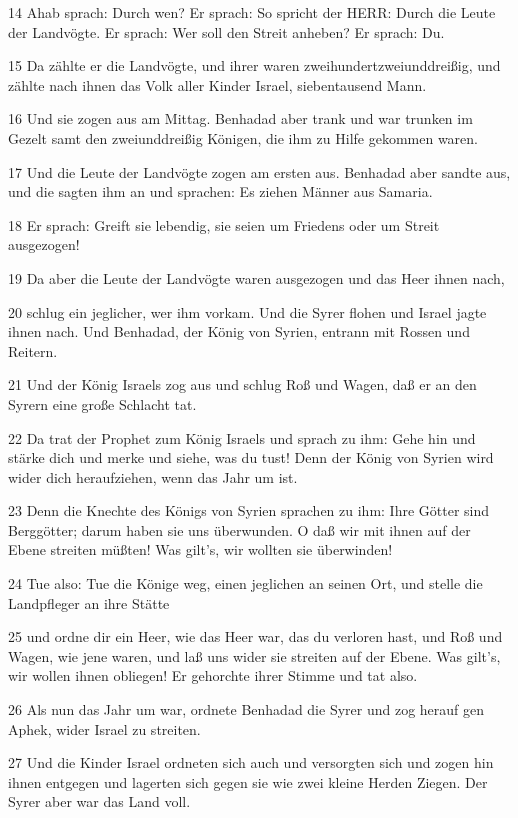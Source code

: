 \par 14 Ahab sprach: Durch wen? Er sprach: So spricht der HERR: Durch die Leute der Landvögte. Er sprach: Wer soll den Streit anheben? Er sprach: Du.
\par 15 Da zählte er die Landvögte, und ihrer waren zweihundertzweiunddreißig, und zählte nach ihnen das Volk aller Kinder Israel, siebentausend Mann.
\par 16 Und sie zogen aus am Mittag. Benhadad aber trank und war trunken im Gezelt samt den zweiunddreißig Königen, die ihm zu Hilfe gekommen waren.
\par 17 Und die Leute der Landvögte zogen am ersten aus. Benhadad aber sandte aus, und die sagten ihm an und sprachen: Es ziehen Männer aus Samaria.
\par 18 Er sprach: Greift sie lebendig, sie seien um Friedens oder um Streit ausgezogen!
\par 19 Da aber die Leute der Landvögte waren ausgezogen und das Heer ihnen nach,
\par 20 schlug ein jeglicher, wer ihm vorkam. Und die Syrer flohen und Israel jagte ihnen nach. Und Benhadad, der König von Syrien, entrann mit Rossen und Reitern.
\par 21 Und der König Israels zog aus und schlug Roß und Wagen, daß er an den Syrern eine große Schlacht tat.
\par 22 Da trat der Prophet zum König Israels und sprach zu ihm: Gehe hin und stärke dich und merke und siehe, was du tust! Denn der König von Syrien wird wider dich heraufziehen, wenn das Jahr um ist.
\par 23 Denn die Knechte des Königs von Syrien sprachen zu ihm: Ihre Götter sind Berggötter; darum haben sie uns überwunden. O daß wir mit ihnen auf der Ebene streiten müßten! Was gilt's, wir wollten sie überwinden!
\par 24 Tue also: Tue die Könige weg, einen jeglichen an seinen Ort, und stelle die Landpfleger an ihre Stätte
\par 25 und ordne dir ein Heer, wie das Heer war, das du verloren hast, und Roß und Wagen, wie jene waren, und laß uns wider sie streiten auf der Ebene. Was gilt's, wir wollen ihnen obliegen! Er gehorchte ihrer Stimme und tat also.
\par 26 Als nun das Jahr um war, ordnete Benhadad die Syrer und zog herauf gen Aphek, wider Israel zu streiten.
\par 27 Und die Kinder Israel ordneten sich auch und versorgten sich und zogen hin ihnen entgegen und lagerten sich gegen sie wie zwei kleine Herden Ziegen. Der Syrer aber war das Land voll.
